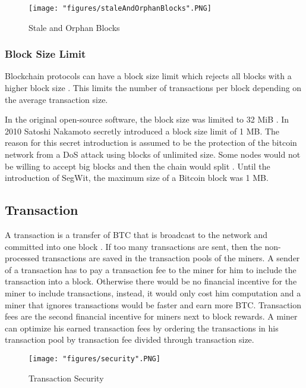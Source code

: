 \begin{figure}[!htb]
\centering
\texttt{[image: "figures/staleAndOrphanBlocks".PNG]}
\caption{Stale and Orphan Blocks \cite{staleAndOrphanBlocks}
\label{fig:staleAndOrphanBlocks}}
\end{figure}

\subsubsection{Block Size Limit}
Blockchain protocols can have a block size limit which rejects all blocks with a higher block size \cite{blockSizeLimit}. This limits the number of transactions per block depending on the average transaction size.

In the original open-source software, the block size was limited to 32 MiB \cite{weightunits}. In 2010 Satoshi Nakamoto secretly introduced a block size limit of 1 MB. The reason for this secret introduction is assumed to be the protection of the bitcoin network from a DoS attack using blocks of unlimited size. Some nodes would not be willing to accept big blocks and then the chain would split \cite{dinkins}. Until the introduction of SegWit, the maximum size of a Bitcoin block was 1 MB.

\subsection{Transaction}
A transaction is a transfer of BTC that is broadcast to the network and committed into one block \cite{transaction}. If too many transactions are sent, then the non-processed transactions are saved in the transaction pools of the miners. A sender of a transaction has to pay a transaction fee to the miner for him to include the transaction into a block. Otherwise there would be no financial incentive for the miner to include transactions, instead, it would only cost him computation and a miner that ignores transactions would be faster and earn more BTC. Transaction fees are the second financial incentive for miners next to block rewards. A miner can optimize his earned transaction fees by ordering the transactions in his transaction pool by transaction fee divided through transaction size.


\begin{figure}[!htb]
\texttt{[image: "figures/security".PNG]}
\caption{Transaction Security \cite{doublespending2} \label{fig:security}}
\end{figure}

